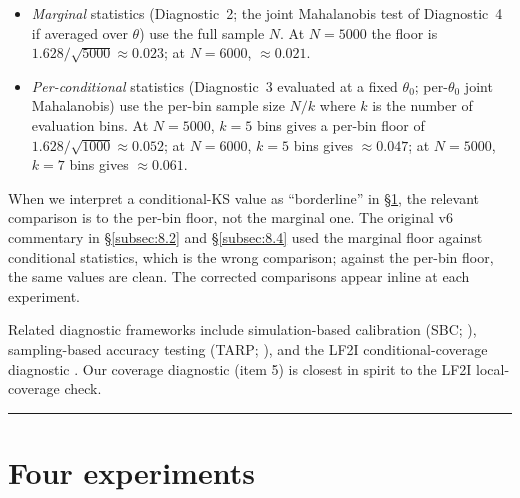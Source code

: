 \documentclass[11pt]{article}
\providecommand{\tightlist}{\setlength{\itemsep}{0pt}\setlength{\parskip}{0pt}}
\begin{document}
\begin{itemize}
\tightlist
\item \emph{Marginal} statistics (Diagnostic~2; the joint Mahalanobis
  test of Diagnostic~4 if averaged over \(\theta\)) use the full sample
  \(N\). At \(N = 5000\) the floor is
  \(1.628/\sqrt{5000} \approx 0.023\); at \(N = 6000\), \(\approx 0.021\).
\item \emph{Per-conditional} statistics (Diagnostic~3 evaluated at a
  fixed \(\theta_0\); per-\(\theta_0\) joint Mahalanobis) use the
  per-bin sample size \(N/k\) where \(k\) is the number of evaluation
  bins. At \(N = 5000\), \(k = 5\) bins gives a per-bin floor of
  \(1.628/\sqrt{1000} \approx 0.052\); at \(N = 6000\), \(k = 5\) bins
  gives \(\approx 0.047\); at \(N = 5000\), \(k = 7\) bins gives
  \(\approx 0.061\).
\end{itemize}

When we interpret a conditional-KS value as ``borderline'' in
\S\ref{sec:8}, the relevant comparison is to the per-bin floor, not the
marginal one. The original v6 commentary in \S\ref{subsec:8.2} and
\S\ref{subsec:8.4} used the marginal floor against conditional
statistics, which is the wrong comparison; against the per-bin floor,
the same values are clean. The corrected comparisons appear inline at
each experiment.

Related diagnostic frameworks include simulation-based calibration (SBC;
\citealp{TaltsEtAl2018}), sampling-based accuracy testing (TARP;
\citealp{LemosEtAl2023}), and the LF2I conditional-coverage diagnostic
\citep{DalmassoEtAl2024}. Our coverage diagnostic (item 5) is closest
in spirit to the LF2I local-coverage check.

\medskip\hrule\medskip

\section{Four experiments}\label{sec:8}
\end{document}
